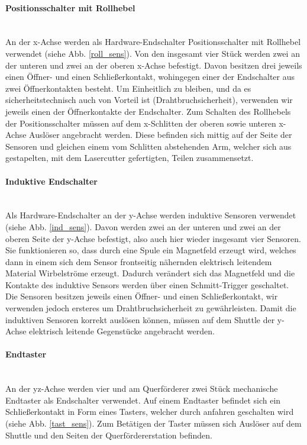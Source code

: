 \paragraph{Positionsschalter mit Rollhebel} \mbox{}\\
An der x-Achse werden als Hardware-Endschalter Positionsschalter mit Rollhebel verwendet (siehe Abb. \ref{roll_sens}). Von den insgesamt vier Stück werden zwei an der unteren und zwei an der oberen x-Achse befestigt. Davon besitzen drei jeweils einen Öffner- und einen Schließerkontakt, wohingegen einer der Endschalter aus zwei Öffnerkontakten besteht. Um Einheitlich zu bleiben, und da es sicherheitstechnisch auch von Vorteil ist (Drahtbruchsicherheit), verwenden wir jeweils einen der Öffnerkontakte der Endschalter. Zum Schalten des Rollhebels der Positionsschalter müssen auf dem x-Schlitten der oberen sowie unteren x-Achse Auslöser angebracht werden. Diese befinden sich mittig auf der Seite der Sensoren und gleichen einem vom Schlitten abstehenden Arm, welcher sich aus gestapelten, mit dem Lasercutter gefertigten, Teilen zusammensetzt.

\paragraph{Induktive Endschalter} \mbox{}\\
Als Hardware-Endschalter an der y-Achse werden induktive Sensoren verwendet (siehe Abb. \ref{ind_sens}). Davon werden zwei an der unteren und zwei an der oberen Seite der y-Achse befestigt, also auch hier wieder insgesamt vier Sensoren. Sie funktionieren so, dass durch eine Spule ein Magnetfeld erzeugt wird, welches dann in einem sich dem Sensor frontseitig nähernden elektrisch leitendem Material Wirbelströme erzeugt. Dadurch verändert sich das Magnetfeld und die Kontakte des induktive Sensors werden über einen Schmitt-Trigger geschaltet. Die Sensoren besitzen jeweils einen Öffner- und einen Schließerkontakt, wir verwenden jedoch ersteres um Drahtbruchsicherheit zu gewährleisten. Damit die induktiven Sensoren korrekt auslösen können, müssen auf dem Shuttle der y-Achse elektrisch leitende Gegenstücke angebracht werden.

\paragraph{Endtaster} \mbox{}\\
An der yz-Achse werden vier und am Querförderer zwei Stück mechanische Endtaster als Endschalter verwendet. Auf einem Endtaster befindet sich ein Schließerkontakt in Form eines Tasters, welcher durch anfahren geschalten wird (siehe Abb. \ref{tast_sens}). Zum Betätigen der Taster müssen sich Auslöser auf dem Shuttle und den Seiten der Querfördererstation befinden.\\

